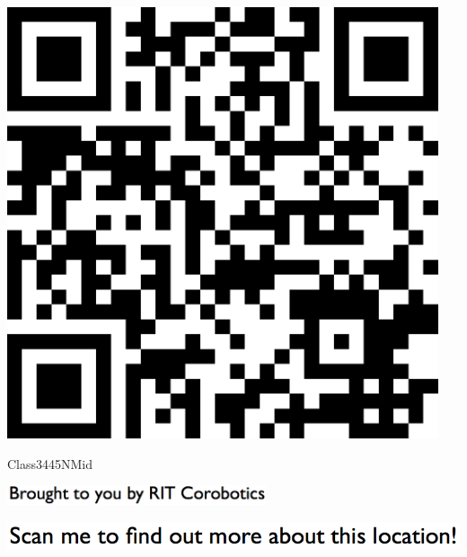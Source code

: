 \documentclass[letterpaper]{article}
\begin{document}
 \begingroup 
 \centerline{\includegraphics[scale=1,width=5in,height=5in]{Class3445NMid.png}} 
 \endgroup 
 \vspace*{\fill} 

 \hfill{\small Class3445NMid} 

  \vspace{0.7in} 
 
 \centerline{\includegraphics[scale=1,width=3in]{text-bottom.png}} 
 
 \pagebreak 
{} 
 \vspace*{\fill} 
 
  \centerline{\includegraphics[scale=1,width=6in]{text-top.png}} 
 
 \vspace{0.5in} 
 
\end{document}
